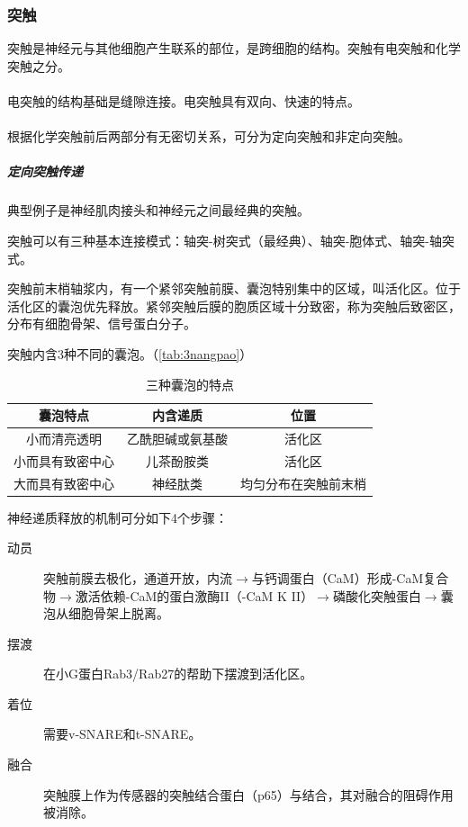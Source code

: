 \subsubsection{突触}

突触是神经元与其他细胞产生联系的部位，是跨细胞的结构。突触有电突触和化学突触之分。

\paragraph{}

电突触的结构基础是缝隙连接。电突触具有双向、快速的特点。

\paragraph{}

根据化学突触前后两部分有无密切关系，可分为定向突触和非定向突触。

\subparagraph{定向突触传递}

典型例子是神经肌肉接头和神经元之间最经典的突触。

突触可以有三种基本连接模式：轴突-树突式（最经典）、轴突-胞体式、轴突-轴突式。

突触前末梢轴浆内，有一个紧邻突触前膜、囊泡特别集中的区域，叫活化区。位于活化区的囊泡优先释放。紧邻突触后膜的胞质区域十分致密，称为突触后致密区，分布有细胞骨架、信号蛋白分子。

突触内含3种不同的囊泡。（\autoref{tab:3nangpao}）

\begin{table}[htbp]
	\centering
	\begin{tabularx}{\textwidth}{|C|C|C|}
		\hline
		\textbf{囊泡特点} & \textbf{内含递质} & \textbf{位置} \\ \hline
		小而清亮透明 & 乙酰胆碱或氨基酸 & 活化区 \\ \hline
		小而具有致密中心 & 儿茶酚胺类 & 活化区 \\ \hline
		大而具有致密中心 & 神经肽类 & 均匀分布在突触前末梢 \\ \hline
	\end{tabularx}
	\caption{三种囊泡的特点}
	\label{tab:3nangpao}
\end{table}

神经递质释放的机制可分如下4个步骤：
\begin{description}
	\item[动员] 突触前膜去极化，通道开放，内流$\longrightarrow$与钙调蛋白（CaM）形成-CaM复合物$\longrightarrow$激活依赖-CaM的蛋白激酶II（-CaM K II）$\longrightarrow$磷酸化突触蛋白$\longrightarrow$囊泡从细胞骨架上脱离。
	\item[摆渡] 在小G蛋白Rab3/Rab27的帮助下摆渡到活化区。
	\item[着位] 需要v-SNARE和t-SNARE。
	\item[融合] 突触膜上作为传感器的突触结合蛋白（p65）与结合，其对融合的阻碍作用被消除。
\end{description}







